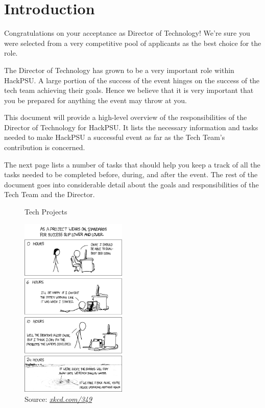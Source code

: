 \documentclass[twoside, 12pt]{article}
\begin{document}
\part{Introduction}
\newpage
\par Congratulations on your acceptance as Director of Technology! We're sure you were selected from a very competitive pool of applicants as the best choice for the role.
\par The Director of Technology has grown to be a very important role within HackPSU. A large portion of the success of the event hinges on the success of the tech team achieving their goals. Hence we believe that it is very important that you be prepared for anything the event may throw at you. 
\par This document will provide a high-level overview of the responsibilities of the Director of Technology for HackPSU. It lists the necessary information and tasks needed to make HackPSU a successful event as far as the Tech Team's contribution is concerned.
\par The next page lists a number of tasks that should help you keep a track of all the tasks needed to be completed before, during, and after the event. The rest of the document goes into considerable detail about the goals and responsibilities of the Tech Team and the Director.
\begin{figure} [ht]
  \centering
  \caption{Tech Projects}
  \includegraphics[width=0.45\textwidth]{success.png}
  \caption*{Source: \href{https://xkcd.com/349}{\textit{xkcd.com/349}} \cite{xkcd_success}}
  \label{fig:success}
\end{figure}
\newpage
\end{document}

